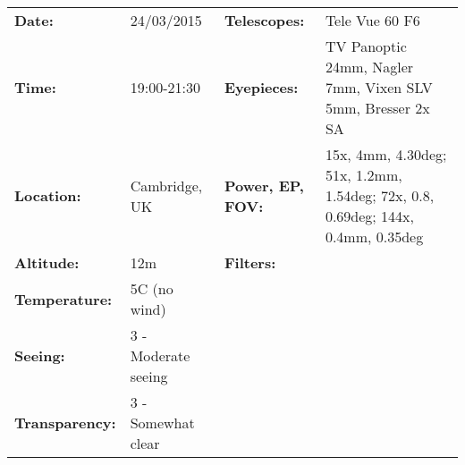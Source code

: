 \begin{tabular}{ p{0.9in} p{1.3in} p{1.2in} p{5.2in}}
{\bf Date:} & 24/03/2015 & {\bf Telescopes:} & Tele Vue 60 F6 \\ 
{\bf Time:} & 19:00-21:30 & {\bf Eyepieces:} & TV Panoptic 24mm, Nagler 7mm, Vixen SLV 5mm, Bresser 2x SA \\ 
{\bf Location:} & Cambridge, UK & {\bf Power, EP, FOV:} & 15x, 4mm, 4.30deg; 51x, 1.2mm, 1.54deg; 72x, 0.8, 0.69deg; 144x, 0.4mm, 0.35deg \\ 
{\bf Altitude:} & 12m & {\bf Filters:} &  \\ 
{\bf Temperature:} & 5C (no wind) & & \\ 
{\bf Seeing:} & 3 - Moderate seeing & & \\ 
{\bf Transparency:} & 3 - Somewhat clear & & \\ 
\end{tabular}
